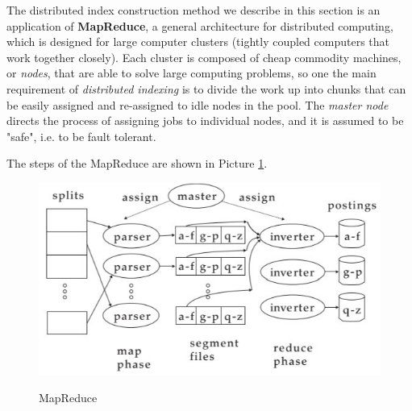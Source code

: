 The distributed index construction method we describe in this section is an application of \textbf{MapReduce}, a general architecture for distributed computing, which is designed for large computer clusters (tightly coupled computers that work together closely). Each cluster is composed of cheap commodity machines, or \textit{nodes}, that are able to solve large computing problems, so one the main requirement of \textit{distributed indexing} is to divide the work up into chunks that can be easily assigned and re-assigned to idle nodes in the pool. The \textit{master node} directs the process of assigning jobs to individual nodes, and it is assumed to be "safe", i.e. to be fault tolerant.

The steps of the MapReduce are shown in Picture \ref{map reduce}.

\begin{figure}[h!]
		\centering
		\includegraphics[scale = 1.5]{img/map reduce.jpg}
		\label{map reduce}
        \caption{MapReduce}
\end{figure}

